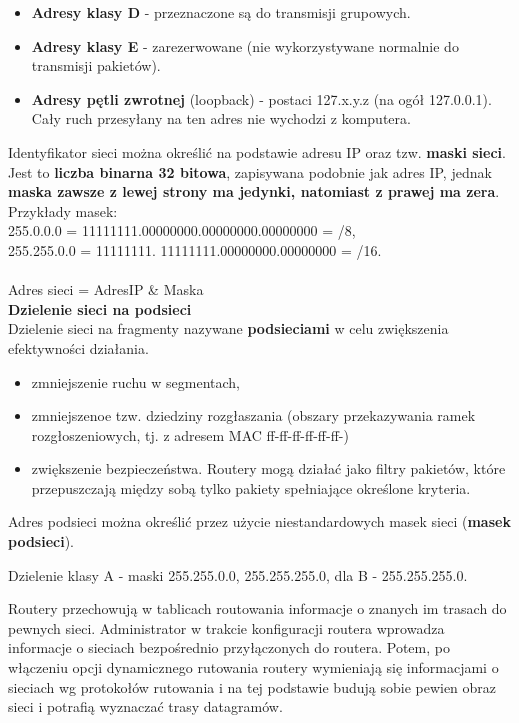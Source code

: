 \documentclass[../main.tex]{subfiles}
\begin{document}
    \begin{itemize}
        \item \textbf{Adresy klasy D} - przeznaczone są do transmisji grupowych.
        \item \textbf{Adresy klasy E} - zarezerwowane (nie wykorzystywane normalnie do transmisji pakietów).
        \item \textbf{Adresy pętli zwrotnej} (loopback) - postaci 127.x.y.z (na ogół 127.0.0.1). Cały ruch przesyłany na ten adres nie wychodzi z komputera.
    \end{itemize}

    Identyfikator sieci można określić na podstawie adresu IP oraz tzw. \textbf{maski sieci}. Jest to \textbf{liczba binarna 32 bitowa}, zapisywana podobnie jak adres IP, jednak \textbf{maska zawsze z lewej strony ma jedynki, natomiast z prawej ma zera}.\\
    Przykłady masek:\\
    255.0.0.0 = 11111111.00000000.00000000.00000000 = /8,\\
    255.255.0.0 = 11111111. 11111111.00000000.00000000 = /16.\\
    \\
    Adres sieci = AdresIP \& Maska\\


    \textbf{Dzielenie sieci na podsieci}\\
    Dzielenie sieci na fragmenty nazywane \textbf{podsieciami} w celu zwiększenia efektywności działania.
    \begin{itemize}
        \item zmniejszenie ruchu w segmentach,
        \item zmniejszenoe tzw. dziedziny rozgłaszania (obszary przekazywania ramek rozgłoszeniowych,
        tj. z adresem MAC ff-ff-ff-ff-ff-ff-)
        \item zwiększenie bezpieczeństwa. Routery mogą działać jako filtry pakietów, które
        przepuszczają między sobą tylko pakiety spełniające określone kryteria.
    \end{itemize}
    Adres podsieci można określić przez użycie niestandardowych masek sieci (\textbf{masek podsieci}).

    Dzielenie klasy A - maski 255.255.0.0, 255.255.255.0, dla B - 255.255.255.0.

    Routery przechowują w tablicach routowania informacje o znanych im trasach do pewnych sieci. Administrator w trakcie konfiguracji routera wprowadza informacje o sieciach bezpośrednio przyłączonych do routera. Potem, po włączeniu opcji dynamicznego rutowania
    routery wymieniają się informacjami o sieciach wg protokołów rutowania i na tej podstawie budują sobie pewien obraz
    sieci i potrafią wyznaczać trasy datagramów.
\end{document}
